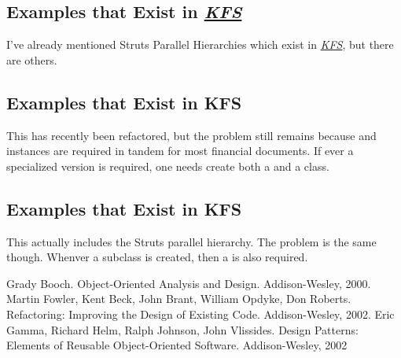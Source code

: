 \documentclass[12pt,notitlepage]{article}
\newcommand{\KFS}{\emph{\href{http://www.kuali.org}{KFS}}}
\begin{document}
\begin{s5presentation}
      \subsection{Examples that Exist in \KFS}
      I've already mentioned Struts Parallel Hierarchies which exist in \KFS, but there are others. 

      \begin{description}
        \W \begin{s5slide}
        \W \section{Examples that Exist in KFS}
        \item[\sf{SourceAccountingLine}\rm{} and \sf{TargetAccountingLine}\rm{}]
          This has recently been refactored, but the problem still remains because 
          \rm{} and \rm{} instances are required in tandem for most financial documents. 
          If ever a specialized version is required, one needs create both a \rm{} and a \rm{}
          class.
          \W \end{s5slide}
        
        \W \begin{s5slide}
          \W \section{Examples that Exist in KFS}
      \item[\sf{AccountingDocument}\rm{} and \sf{AccountingDocumentRule}\rm{}]
          This actually includes the Struts parallel hierarchy. The problem is the same though. Whenver a \rm{} subclass 
          is created, then a \rm{} is also required.
          \W \end{s5slide}
      \end{description}
      
  \W \end{s5presentation}
  \begin{tex}
    \begin{thebibliography}{20}
     Grady Booch. Object-Oriented Analysis and Design. Addison-Wesley, 2000.
     Martin Fowler, Kent Beck, John Brant, William Opdyke, Don Roberts. Refactoring: Improving the Design of Existing Code. Addison-Wesley, 2002.
     Eric Gamma, Richard Helm, Ralph Johnson, John Vlissides. Design Patterns: Elements of Reusable Object-Oriented Software. Addison-Wesley, 2002
    \end{thebibliography}
  \end{tex}
\end{document}
